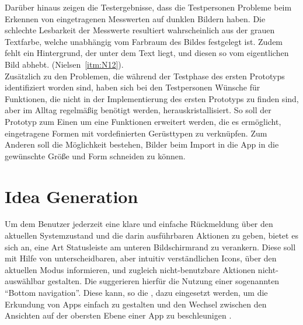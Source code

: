 Darüber hinaus zeigen die Testergebnisse, dass die Testpersonen Probleme beim Erkennen von eingetragenen Messwerten auf dunklen Bildern haben.
Die schlechte Lesbarkeit der Messwerte resultiert wahrscheinlich aus der grauen Textfarbe, welche unabhängig vom Farbraum des Bildes festgelegt ist.
Zudem fehlt ein Hintergrund, der unter dem Text liegt, und diesen so vom eigentlichen Bild abhebt.
(Nielsen~\autoref{itm:N12}). \\

Zusätzlich zu den Problemen, die während der Testphase des ersten Prototyps identifiziert worden sind, haben sich bei den Testpersonen Wünsche für Funktionen, die nicht in der Implementierung des ersten Prototyps zu finden sind, aber im Alltag regelmäßig benötigt werden, herauskristallisiert. 
So soll der Prototyp zum Einen um eine Funktionen erweitert werden, die es ermöglicht, eingetragene Formen mit vordefinierten Gerüsttypen zu verknüpfen.
Zum Anderen soll die Möglichkeit bestehen, Bilder beim Import in die App in die gewünschte Größe und Form schneiden zu können.

\section{Idea Generation}\label{sec:idea2}
Um dem Benutzer jederzeit eine klare und einfache Rückmeldung über den aktuellen Systemzustand und die darin ausführbaren Aktionen zu geben, bietet es sich an, eine Art Statusleiste am unteren Bildschirmrand zu verankern.
Diese soll mit Hilfe von unterscheidbaren, aber intuitiv verständlichen Icons, über den aktuellen Modus informieren, und zugleich nicht-benutzbare Aktionen nicht-auswählbar gestalten.
Die \mg{} suggerieren hierfür die Nutzung einer sogenannten ``Bottom navigation''.
Diese kann, so die \mg{}, dazu eingesetzt werden, um die Erkundung von Apps einfach zu gestalten und den Wechsel zwischen den Ansichten auf der obersten Ebene einer App zu beschleunigen \citep{BN18}. \\

